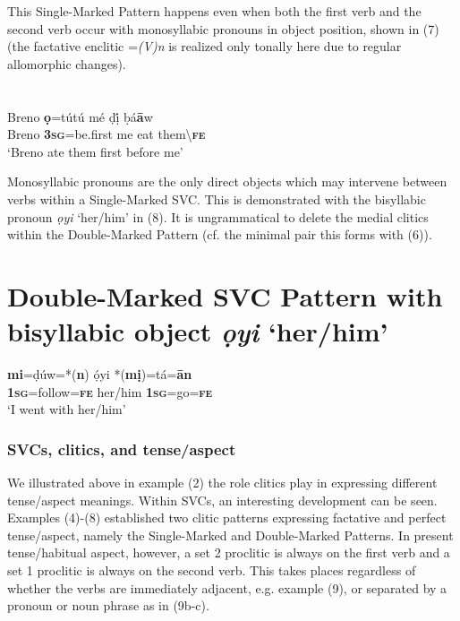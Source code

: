\documentclass[output=paper]{langsci/langscibook}
\begin{document}
\begin{styleNoSpacing}
This Single-Marked Pattern happens even when both the first verb and the second verb occur with monosyllabic pronouns in object position, shown in (7) (the factative enclitic =\textit{(V)n} is realized only tonally here due to regular allomorphic changes).
\end{styleNoSpacing}

\chapter[]{}
\label{bkm:Ref448080695}\gll Breno   \textbf{ọ}=tútú     mé   ḍị́   ḅá\textbf{\={a}}w\\
     Breno  \textbf{\textsc{3sg}}=be.first  me  eat  them{\textbackslash}\textbf{\textsc{fe}}\\
\glt ‘Breno ate them first before me’
\z

Monosyllabic pronouns are the only direct objects which may intervene between verbs within a Single-Marked SVC. This is demonstrated with the bisyllabic pronoun \textit{ọyi} ‘her/him’ in (8). It is ungrammatical to delete the medial clitics within the Double-Marked Pattern (cf. the minimal pair this forms with (6)). 

\chapter[Double{}-Marked SVC Pattern with bisyllabic object ọyi ‘her/him’]{Double-Marked SVC Pattern with bisyllabic object \textit{ọyi} ‘her/him’}
\label{bkm:Ref419898704}\gll \textbf{mi}=ḍúw=*(\textbf{n})     ọ́yi     *(\textbf{mị})=tá=\textbf{\={a}n}\\
     \textbf{1}\textbf{\textsc{sg}}=follow=\textbf{\textsc{fe}}   her/him   \textbf{1}\textbf{\textsc{sg}}=go=\textbf{\textsc{fe}}\\
\glt ‘I went with her/him’ \citep[201]{Kari2004}
\z

\subsection{\rmfamily SVCs, clitics, and tense/aspect}

We illustrated above in example (2) the role clitics play in expressing different tense/aspect meanings. Within SVCs, an interesting development can be seen. Examples (4){}-(8) established two clitic patterns expressing factative and perfect tense/aspect, namely the Single-Marked and Double-Marked Patterns. In present tense/habitual aspect, however, a set 2 proclitic is always on the first verb and a set 1\textit{ }proclitic is always on the second verb. This takes places regardless of whether the verbs are immediately adjacent, e.g. example (9), or separated by a pronoun or noun phrase as in (9b-c). 
\end{document}
